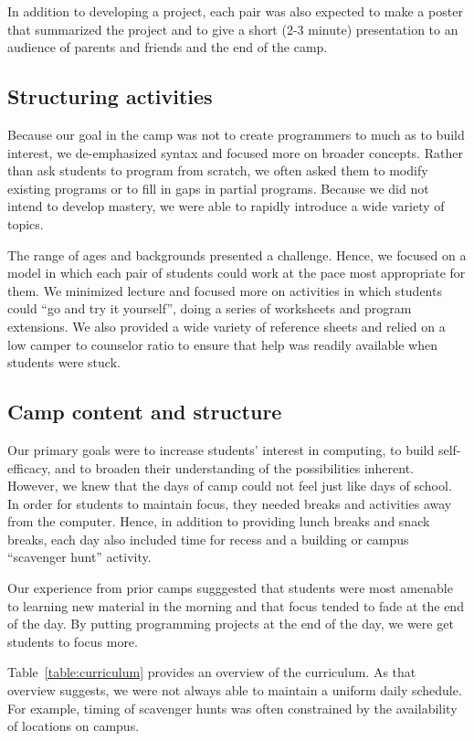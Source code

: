 In addition to developing a project, each pair was also expected to make
a poster that summarized the project and to give a short (2-3 minute)
presentation to an audience of parents and friends and the end of the
camp.

\subsection{Structuring activities}

Because our goal in the camp was not to create programmers to much as
to build interest, we de-emphasized syntax and focused more on broader
concepts.  Rather than ask students to program from scratch, we often
asked them to modify existing programs or to fill in gaps in partial
programs.  Because we did not intend to develop mastery, we were
able to rapidly introduce a wide variety of topics.

The range of ages and backgrounds presented a challenge.  Hence,
we focused on a model in which each pair of students could work at the
pace most appropriate for them.  We minimized lecture and focused more
on activities in which students could ``go and try it yourself'', doing
a series of worksheets and program extensions.  We also provided a wide
variety of reference sheets and relied on a low camper to counselor
ratio to ensure that help was readily available when students were stuck.

\subsection{Camp content and structure}

Our primary goals were to increase students' interest in computing,
to build self-efficacy, and to broaden their understanding of the possibilities
inherent.  However, we knew that the days of camp could not feel just like
days of school.  In order for students to maintain focus, they needed
breaks and activities away from the computer.  Hence, in addition to
providing lunch breaks and snack breaks, each day also included time for 
recess and a building or campus ``scavenger hunt'' activity.

Our experience from prior camps sugggested that students were most
amenable to learning new material in the morning and that focus
tended to fade at the end of the day.  By putting programming
projects at the end of the day, we were get students to focus more.

Table~\ref{table:curriculum} provides an overview of the curriculum.
As that overview suggests, we were not always able to maintain a uniform daily 
schedule.  For example, timing of scavenger hunts was often constrained by
the availability of locations on campus.  

